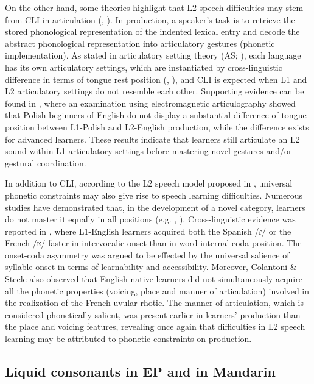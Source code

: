 \documentclass[output=paper]{../langscibook}
\begin{document}
On the other hand, some theories highlight that L2 speech difficulties may stem from CLI in articulation (\citealt{Honikman1964}, \citealt{ZimmerAlves2012}). In production, a speaker’s task is to retrieve the stored phonological representation of the indented lexical entry and decode the abstract phonological representation into articulatory gestures (phonetic implementation). As stated in articulatory setting theory (AS; \citealt{Honikman1964}), each language has its own articulatory settings, which are instantiated by cross-linguistic difference in terms of tongue rest position (\citealt{GickEtAl2004}, \citealt{WilsonGick2014}), and CLI is expected when L1 and L2 articulatory settings do not resemble each other. Supporting evidence can be found in \citet{Swiecinski2013}, where an examination using electromagnetic articulography showed that Polish beginners of English do not display a substantial difference of tongue position between L1-Polish and L2-English production, while the difference exists for advanced learners. These results indicate that learners still articulate an L2 sound within L1 articulatory settings before mastering novel gestures and/or gestural coordination.

In addition to CLI, according to the L2 speech model proposed in \citet{ColantoniSteele2008}, universal phonetic constraints may also give rise to speech learning difficulties. Numerous studies have demonstrated that, in the development of a novel category, learners do not master it equally in all positions (e.g. \citealt{ColantoniSteele2008}, \citealt{Waltmunson2005}). Cross-linguistic evidence was reported in \citet{ColantoniSteele2008}, where L1-English learners acquired both the Spanish /ɾ/ or the French /ʁ/ faster in intervocalic onset than in word-internal coda position. The onset-coda asymmetry was argued to be effected by the universal salience of syllable onset in terms of learnability and accessibility. Moreover, Colantoni \& Steele also observed that English native learners did not simultaneously acquire all the phonetic properties (voicing, place and manner of articulation) involved in the realization of the French uvular rhotic. The manner of articulation, which is considered phonetically salient, was present earlier in learners’ production than the place and voicing features, revealing once again that difficulties in L2 speech learning may be attributed to phonetic constraints on production.



\subsection{Liquid consonants in EP and in Mandarin}
\label{sec:zhou:3}
\end{document}
